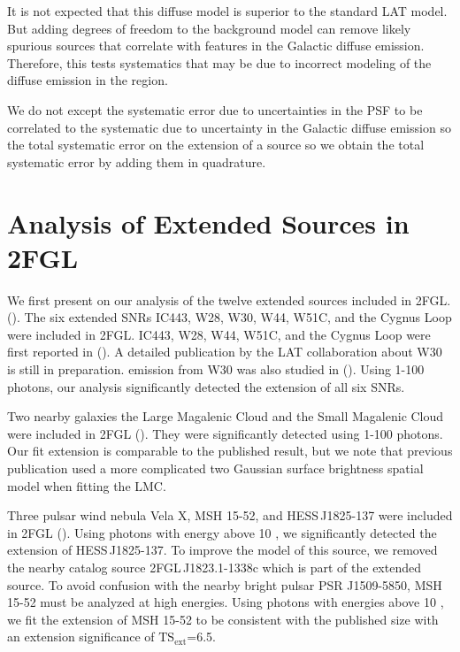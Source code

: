 \documentclass[12pt,preprint]{aastex}
\newcommand{\gev}{\text{GeV}\xspace}
\newcommand{\tsext}{{\ensuremath{\text{TS}_{\text{ext}}}}\xspace}
\begin{document}
It is not expected that this diffuse model is superior to the standard
LAT model.  But adding degrees of freedom to the background model can
remove likely spurious sources that correlate with features in the
Galactic diffuse emission.  Therefore, this tests systematics that may
be due to incorrect modeling of the diffuse emission in the region.

We do not except the systematic error due to uncertainties in the PSF to
be correlated to the systematic due to uncertainty in the Galactic diffuse
emission so the total systematic error on the extension of a source so
we obtain the total systematic error by adding them in quadrature.

\section{Analysis of Extended Sources in 2FGL}
\label{validate_known}


We first present on our analysis of the twelve extended sources
included in 2FGL.
(\cite{second_cat}).
The six extended SNRs IC443, W28, W30, W44, W51C, and the
Cygnus Loop were included in 2FGL.  IC443, W28, W44, W51C, and the
Cygnus Loop were
first reported in (\cite{ic443,w28,w44,w51c,cygnus_loop_lat}).  A
detailed publication by the LAT
collaboration about W30 is still in preparation.
\gev emission from W30 was also studied in (\cite{castro_and_slane_2010}).
Using 1-100 \gev photons, our analysis significantly detected the
extension of all six SNRs.

Two nearby galaxies the Large Magalenic Cloud and the Small Magalenic
Cloud were included in 2FGL (\cite{lmc,smc}).  They were significantly
detected using 1-100 \gev photons. Our
fit extension is comparable to the published result, but we note that
previous publication used a more complicated two Gaussian surface
brightness spatial model when fitting the LMC.

Three pulsar wind nebula Vela X, MSH 15-52, and HESS\,J1825-137 were
included in 2FGL (\cite{velax,msh1552,fermi_hess_j1825}).  Using photons
with energy above 10 \gev, we significantly detected the extension of
HESS\,J1825-137.  To improve the model of this source, we removed the
nearby catalog source 2FGL\,J1823.1-1338c which is part of the extended
source.  To avoid confusion with the nearby bright pulsar PSR J1509-5850, MSH 15-52 must be
analyzed at high energies.  Using photons with energies above 10 \gev,
we fit the extension of MSH 15-52 to be consistent with the published
size with an extension significance of \tsext=6.5.  
\end{document}
